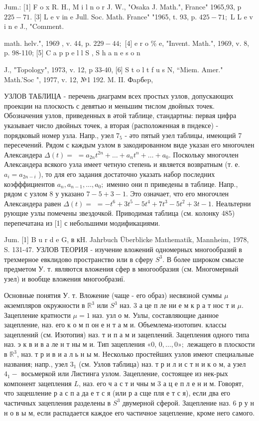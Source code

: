 \documentclass[10pt]{article}
\begin{document}
Jum.: [1] F o x R. H., M i l n o r J. W., "Osaka J. Math.", France" 1965,93, p $225-71$. [3] L e v in e Jull. Soc. Math. France" "1965, t. 93, p. $425-71 ;$ L L e v i n e J., "Comment.

math. helv.", 1969 , v. 44, p. $229-44 ;$ [4] e r o \% e, "Invent. Math.", 1969, v. 8, p. 98-110; [5] C a p p e l l S , S h a n e s o n

J., "Topology", 1973, v. 12, p 33-40, [6] S t o l t f u s N, “Miem. Amer." Math.'Soc ", 1977, v. 12, №1 192. M. II. Фapбep,



УЗЛОВ ТАБЛИЦА - перечень диаграмм всех простых узлов, допускающих проекции на плоскость с девятью и меньшим тислом двойных точек. Обозначения узлов, приведенных в әтой таблице, стандартны: первая цифра указывает число двойных точек, а вторая (расположенная в пндексе) - порядковый номер узла. Напр., узел $7_{5}$ - әто пятый узел таблицы, имеющий 7 пересечений. Рядом с каждым узлом в закодированном виде указан его многочлен Александера $\Delta(t)=$ $=a_{2 n} t^{2 n}+\ldots+a_{n} t^{n}+\ldots+a_{0}$. Поскольку многочлен Александера всякого узла имеет четную степень и является возвратным (т. е. $a_{i}=a_{2 n-i}$ ), то для его задания достаточно указать набор последних коэфффициентов $a_{n}, a_{n-1}, \ldots, a_{0} ;$ именно они п приведены в таблице. Напр., рядом с узлом 8 у указано $7-5+3-1$. Это означает, что его многочлен Александера равен $\Delta(t)=$ $=-t^{6}+3 t^{5}-5 t^{4}+7 t^{3}-5 t^{2}+3 t-1$. Неальтерни рующие узлы помечены звездочкой. Приводимая таблица (см. колонку 485) перепечатана из [1] с небольшими модификациями.



Jum. [1] B u r d e G, в кH. Jahrbuch Überblicke Mathematik, Mannheim, 1978, S. 131-47. УЗЛОВ ТЕОРИЯ - изучение вложений одномерных многообразий в трехмерное евклидово пространство или в сферу $S^{3}$. В более широком смысле предметом У. т. являются вложения сфер в многообразия (см. Многомерный узел) и вообще вложения многообразиї.



Основные понятия У. т. Вложение (чаще - его образ) несвязной суммы $\mu$ әкземпляров окружности в $\mathbb{R}^{3}$ или $S^{3}$ наз. 3 а це п ле ни е м к р а т нос т и $\mu$. Зацепление кратности $\mu=1$ наз. узл о м. Узлы, составляющие данное зацепление, наз. его к о м п он е н т а м и. Объемлема-изотопич. классы зацеплений (см. Изотопия) наз. т и п а м и зацеплений. Зацепления одного типа наз. э к в и в а ле н т ны м и. Тип зацепления «0, $0, \ldots, 0 » ;$ лежащего в плоскости в $\mathbb{R}^{3}$, наз. т р и в и а л ь н ы м. Несколько простейших узлов имеют специальные названия; напр., узел $3_{1}$ (см. Узлов таблица) наз. т р и л и с т н и к о м, а узел $4_{1}-$ восьмеркой или Листинга узлом. Зацепление, состоящее из нек-рых компонент зацепления $L$, наз. его ч а с т и чны м 3 а ц е п л е н и м. Говорят, что зацешление р а с п а да е т с я (или р а сще пля е т с я), если два его частичных зацепления разделены в $S^{3}$ двумерной сферой. Зацепление наз. 6 р у н н о в ы м, если распадается каждое его частичное зацепление, кроме него самого.
\end{document}
